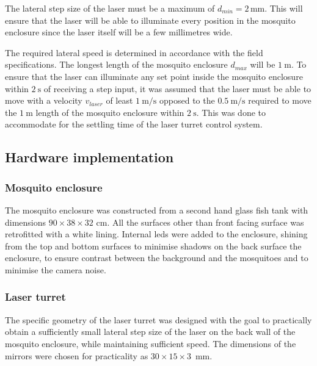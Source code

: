 \newcommand{\requiredLatStepSizeMM}{2}
The lateral step size of the laser must be a maximum of $d_{min} = \requiredLatStepSizeMM$\,mm. This will ensure that the laser will be able to illuminate every position in the mosquito enclosure since the laser itself will be a few millimetres wide.

\newcommand{\requiredLatSpeedMPS}{1}
The required lateral speed is determined in accordance with the field specifications. The longest length of the mosquito enclosure $d_{max}$ will be $\SI{1}{\meter}$. To ensure that the laser can illuminate any set point inside the mosquito enclosure within $\SI{2}{\second}$ of receiving a step input, it was assumed that the laser must be able to move with a velocity $v_{laser}$ of least $\SI{\requiredLatSpeedMPS}{\meter\per\second}$ opposed to the $\SI{0.5}{\meter\per\second}$ required to move the $\SI{1}{\meter}$ length of the mosquito enclosure within $\SI{2}{\second}$. This was done to accommodate for the settling time of the laser turret control system.




\subsection{Hardware implementation}



\subsubsection{Mosquito enclosure}
\newcommand{\enclosureWidthCM}{90} %
\newcommand{\enclosureHeightCM}{38} %
\newcommand{\enclosureDepthCM}{32} %

The mosquito enclosure was constructed from a second hand glass fish tank with dimensions $\enclosureWidthCM \times \enclosureHeightCM \times \enclosureDepthCM$ cm. All the surfaces other than front facing surface was retrofitted with a white lining. Internal \glspl{led} were added to the enclosure, shining from the top and bottom surfaces to minimise shadows on the back surface the enclosure, to ensure contrast between the background and the mosquitoes and to minimise the camera noise.



\subsubsection{Laser turret}
The specific geometry of the laser turret was designed with the goal to practically obtain a sufficiently small lateral step size of the laser on the back wall of the mosquito enclosure, while maintaining sufficient speed. The dimensions of the mirrors were chosen for practicality as $30 \times 15 \times 3$~mm.


